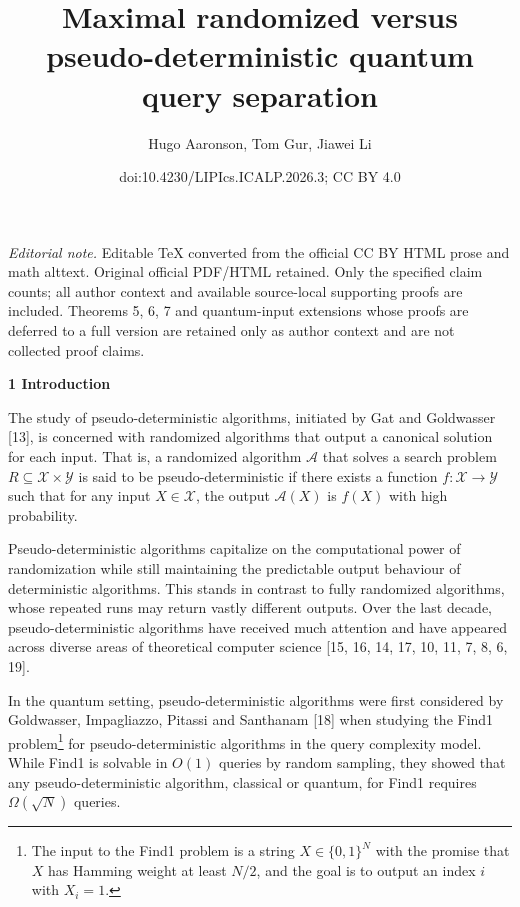 \documentclass[10pt,a4paper]{article}
\title{Maximal randomized versus pseudo-deterministic quantum query separation}
\author{Hugo Aaronson, Tom Gur, Jiawei Li}
\date{doi:10.4230/LIPIcs.ICALP.2026.3; CC BY 4.0}
\begin{document}
\maketitle
\noindent\textit{Editorial note.} Editable TeX converted from the official CC BY HTML prose and math alttext. Original official PDF/HTML retained. Only the specified claim counts; all author context and available source-local supporting proofs are included. Theorems 5, 6, 7 and quantum-input extensions whose proofs are deferred to a full version are retained only as author context and are not collected proof claims.\par\medskip


\par\medskip\noindent\textbf{
1 Introduction}\par




The study of pseudo-deterministic algorithms, initiated by Gat and Goldwasser [13], is concerned with randomized algorithms that output a canonical solution for each input. That is, a randomized algorithm $\mathcal{A}$ that solves a search problem ${R}\subseteq\mathcal{X}\times\mathcal{Y}$ is said to be pseudo-deterministic if there exists a function $f:\mathcal{X}\rightarrow\mathcal{Y}$ such that for any input $X\in\mathcal{X}$, the output $\mathcal{A}(X)$ is $f(X)$ with high probability.\par




Pseudo-deterministic algorithms capitalize on the computational power of randomization while still maintaining the predictable output behaviour of deterministic algorithms. This stands in contrast to fully randomized algorithms, whose repeated runs may return vastly different outputs.
Over the last decade, pseudo-deterministic algorithms have received much attention and have appeared across diverse areas of theoretical computer science [15, 16, 14, 17, 10, 11, 7, 8, 6, 19].\par




In the quantum setting, pseudo-deterministic algorithms were first considered by Goldwasser, Impagliazzo, Pitassi and Santhanam [18] when studying the Find1 problem\footnote{The input to the Find1 problem is a string $X\in\{0,1\}^{N}$ with the promise that $X$ has Hamming weight at least $N/2$, and the goal is to output an index $i$ with $X_{i}=1$.}
for pseudo-deterministic algorithms in the query complexity model. While Find1 is solvable in $O(1)$ queries by random sampling, they showed that any pseudo-deterministic algorithm, classical or quantum, for Find1 requires ${\Omega}(\sqrt{N})$ queries.\par
\end{document}

